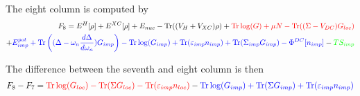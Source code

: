 \documentclass[aps,prb,floatfix,epsfig,singlecolumn,showpacs,preprintnumbers]{revtex4}
\newcommand{\Tr}{\mathrm{Tr}}
\begin{document}
The eight column is computed by
\begin{eqnarray}
F_8=E^H[\rho]+E^{XC}[\rho]+E_{nuc}-\Tr((V_H+V_{XC})\rho)
+\textcolor{red}{\Tr\log( G)+\mu N-\Tr((\Sigma-V_{DC})G_{loc})}
\\
+\textcolor{blue}{E_{imp}^{pot}
+\Tr\left((\Delta-\omega_n\frac{d\Delta}{d\omega_n})G_{imp}\right)
-\Tr\log(G_{imp})+\Tr(\varepsilon_{imp}n_{imp})+\Tr(\Sigma_{imp}G_{imp})
-\Phi^{DC}[n_{imp}]}
-\textcolor{green}{T S_{imp}}
\end{eqnarray}

The difference between the seventh and eight column is then
\begin{eqnarray}
F_8-F_7 = 
\textcolor{red}{\Tr\log(G_{loc})-\Tr(\Sigma G_{loc})-\Tr(\varepsilon_{imp}n_{loc})}
-\textcolor{blue}{\Tr\log(G_{imp})+\Tr(\Sigma G_{imp})+\Tr(\varepsilon_{imp}n_{imp})}
\end{eqnarray}
\end{document}
